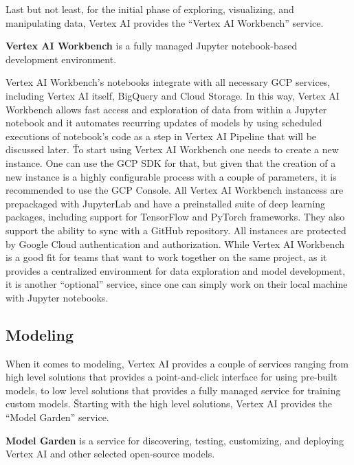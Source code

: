 Last but not least, for the initial phase of exploring, visualizing, and manipulating data, Vertex AI provides the
``Vertex AI Workbench'' service.

\textbf{Vertex AI Workbench} is a fully managed Jupyter notebook-based development environment.
\ed

Vertex AI Workbench's notebooks integrate with all necessary GCP services, including Vertex AI itself, BigQuery and
Cloud Storage. In this way, Vertex AI Workbench allows fast access and exploration of data from within a Jupyter
notebook and it automates recurring updates of models by using scheduled executions of notebook's code as a step in
Vertex AI Pipeline that will be discussed later. \v

To start using Vertex AI Workbench one needs to create a new instance. One can use the GCP SDK for that, but given
that the creation of a new instance is a highly configurable process with a couple of parameters, it is recommended
to use the GCP Console. All Vertex AI Workbench instancess are prepackaged with JupyterLab and have a preinstalled
suite of deep learning packages, including support for TensorFlow and PyTorch frameworks. They also support the
ability to sync with a GitHub repository. All instances are protected by Google Cloud authentication and authorization.
\v

While Vertex AI Workbench is a good fit for teams that want to work together on the same project, as it provides a
centralized environment for data exploration and model development, it is another ``optional'' service, since one can
simply work on their local machine with Jupyter notebooks.

\subsection{Modeling}

When it comes to modeling, Vertex AI provides a couple of services ranging from high level solutions that provides a
point-and-click interface for using pre-built models, to low level solutions that provides a fully managed service for
training custom models. \v

Starting with the high level solutions, Vertex AI provides the ``Model Garden'' service.

\textbf{Model Garden} is a service for discovering, testing, customizing, and deploying Vertex AI and other selected
open-source models.
\ed

